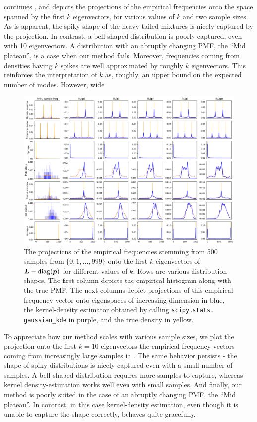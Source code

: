 \documentclass[10pt]{article} %
\DeclareMathOperator{\diag}{diag}
\begin{document}
 continues , and depicts the projections of the empirical frequencies onto the space spanned by the first $k$ eigenvectors, for various values of $k$ and two sample sizes. As is apparent, the spiky shape of the heavy-tailed mixtures is nicely captured by the projection. In contrast, a bell-shaped distribution is poorly captured, even with 10 eigenvectors. A distribution with an abruptly changing PMF, the ``Mid plateau'', is a case when our method fails. Moreover, frequencies coming from densities having $k$ spikes are well approximated by roughly $k$ eigenvectors. This reinforces the interpretation of $k$ as, roughly, an upper bound on the expected number of modes. However, wide 

\begin{figure}[tbh]
    \centering
    \includegraphics[width=\textwidth]{proj_500_samples}
    \caption{The projections of the empirical frequencies stemming from 500 samples from $\{0, 1, \dots, 999\}$ onto the first $k$ eigenvectors of $\mL - \diag(\vp)$ for different values of $k$. Rows are various distribution shapes. The first column depicts the empirical histogram along with the true PMF. The next columns depict projections of this empirical frequency vector onto eigenspaces of increasing dimension in blue, the kernel-density estimator obtained by calling \texttt{scipy.stats.
gaussian\_kde} in purple, and the true density in yellow.}
    \label{fig:apx_synthetic}
\end{figure}

To appreciate how our method scales with various sample sizes, we plot the projection onto the first $k=10$ eigenvectors the empirical frequency vectors coming from increasingly large samples in . The same behavior persists - the shape of spiky distributions is nicely captured even with a small number of samples. A bell-shaped distribution requires more samples to capture, whereas kernel density-estimation works well even with small samples. And finally, our method is poorly suited in the case of an abruptly changing PMF, the ``Mid plateau''. In contrast, in this case kernel-density estimation, even though it is unable to capture the shape correctly, behaves quite gracefully.
\end{document}
